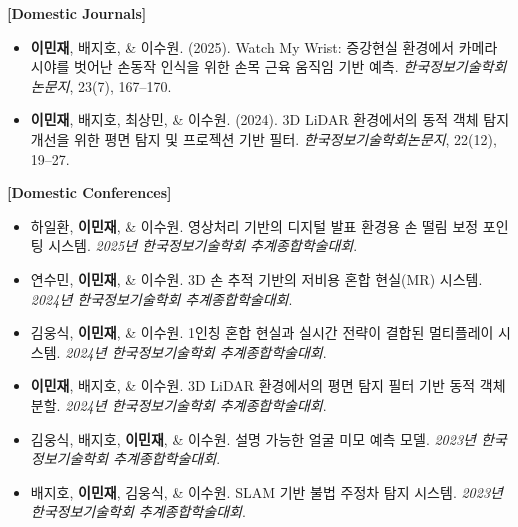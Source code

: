 \documentclass[letterpaper,11pt]{article}
\newcommand{\resumeItem}[1]{
  \item\small{
    {#1 \vspace{0pt}}
  }
}
\newcommand{\resumeSubHeadingListStart}{\begin{itemize}[leftmargin=*]}
\newcommand{\resumeSubHeadingListEnd}{\end{itemize}}
\begin{document}
\textbf{[Domestic Journals]}
\resumeSubHeadingListStart
\resumeItem{\textbf{이민재}, 배지호, \& 이수원. (2025). Watch My Wrist: 증강현실 환경에서 카메라 시야를 벗어난 손동작 인식을 위한 손목 근육 움직임 기반 예측. \textit{한국정보기술학회논문지}, 23(7), 167--170.}
\resumeItem{\textbf{이민재}, 배지호, 최상민, \& 이수원. (2024). 3D LiDAR 환경에서의 동적 객체 탐지 개선을 위한 평면 탐지 및 프로젝션 기반 필터. \textit{한국정보기술학회논문지}, 22(12), 19--27.}
\resumeSubHeadingListEnd

\textbf{[Domestic Conferences]}
\resumeSubHeadingListStart
\resumeItem{하일환, \textbf{이민재}, \& 이수원. 영상처리 기반의 디지털 발표 환경용 손 떨림 보정 포인팅 시스템. \textit{2025년 한국정보기술학회 추계종합학술대회}.}
\resumeItem{연수민, \textbf{이민재}, \& 이수원. 3D 손 추적 기반의 저비용 혼합 현실(MR) 시스템. \textit{2024년 한국정보기술학회 추계종합학술대회}.}
\resumeItem{김웅식, \textbf{이민재}, \& 이수원. 1인칭 혼합 현실과 실시간 전략이 결합된 멀티플레이 시스템. \textit{2024년 한국정보기술학회 추계종합학술대회}.}
\resumeItem{\textbf{이민재}, 배지호, \& 이수원. 3D LiDAR 환경에서의 평면 탐지 필터 기반 동적 객체 분할. \textit{2024년 한국정보기술학회 추계종합학술대회}.}
\resumeItem{김웅식, 배지호, \textbf{이민재}, \& 이수원. 설명 가능한 얼굴 미모 예측 모델. \textit{2023년 한국정보기술학회 추계종합학술대회}.}
\resumeItem{배지호, \textbf{이민재}, 김웅식, \& 이수원. SLAM 기반 불법 주정차 탐지 시스템. \textit{2023년 한국정보기술학회 추계종합학술대회}.}
\resumeSubHeadingListEnd

\end{document}
